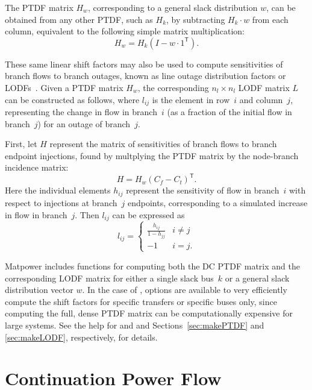 \documentclass[12pt]{article}
\newcommand{\matpower}[0]{{\sc Matpower}}
\newcommand{\code}[1]{{\relsize{-0.5}{\tt{{#1}}}}}  %
\newcommand{\trans}[1]{{#1}^{\ensuremath{\mathsf{T}}}}  %
\numberwithin{equation}{section}
\numberwithin{table}{section}
\numberwithin{figure}{section}
\begin{document}
The PTDF matrix $H_w$, corresponding to a general slack distribution $w$, can be obtained from any other PTDF, such as $H_k$, by subtracting $H_k \cdot w$ from each column, equivalent to the following simple matrix multiplication:
\begin{equation}
H_w = H_k (I - w \cdot \trans{1}).
\end{equation}

These same linear shift factors may also be used to compute sensitivities of branch flows to branch outages, known as line outage distribution factors or LODFs~\cite{guler2007}. Given a PTDF matrix $H_w$, the corresponding $n_l \times n_l$ LODF matrix $L$ can be constructed as follows, where $l_{ij}$ is the element in row~$i$ and column~$j$, representing the change in flow in branch~$i$ (as a fraction of the initial flow in branch~$j$) for an outage of branch~$j$.

First, let $H$ represent the matrix of sensitivities of branch flows to branch endpoint injections, found by multplying the PTDF matrix by the node-branch incidence matrix:
\begin{equation}
H = H_w \trans{(C_f - C_t)}.
\end{equation}
Here the individual elements $h_{ij}$ represent the sensitivity of flow in branch~$i$ with respect to injections at branch~$j$ endpoints, corresponding to a simulated increase in flow in branch~$j$. Then $l_{ij}$ can be expressed as
\begin{equation}
l_{ij} = \left\{\begin{array}{cc}
\displaystyle\frac{h_{ij}}{1 - h_{jj}} & i \neq j \\
-1 & i = j.
\end{array}
\right.
\end{equation}

\matpower{} includes functions for computing both the DC PTDF matrix and the corresponding LODF matrix for either a single slack bus~$k$ or a general slack distribution vector $w$. In the case of \code{makePTDF}, options are available to very efficiently compute the shift factors for specific transfers or specific buses only, since computing the full, dense PTDF matrix can be computationally expensive for large systems.
See the help for \code{makePTDF} and \code{makeLODF} and Sections~\ref{sec:makePTDF} and \ref{sec:makeLODF}, respectively, for details.


\clearpage
\section{Continuation Power Flow}
\end{document}

